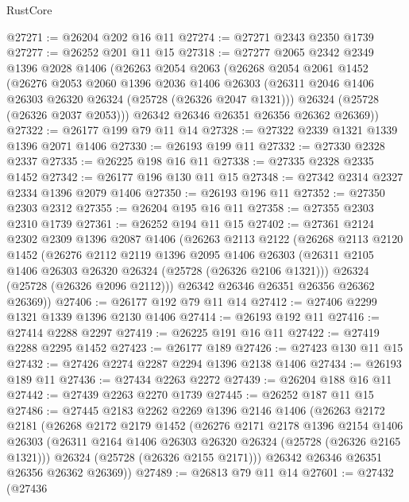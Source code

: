 \begin{lexlean}{RustCore}
\begin{coremodule}
@27271 := @26204 @202 @16 @11
@27274 := @27271 @2343 @2350 @1739
@27277 := @26252 @201 @11 @15
@27318 := @27277
    @2065
    @2342
    @2349
    @1396
    @2028
    @1406
    (@26263
      @2054
      @2063
      (@26268
        @2054
        @2061
        @1452
        (@26276
          @2053
          @2060
          @1396
          @2036
          @1406
          @26303
          (@26311 @2046 @1406 @26303 @26320 @26324 (@25728 (@26326 @2047 @1321)))
          @26324
          (@25728 (@26326 @2037 @2053)))
        @26342
        @26346
        @26351
        @26356
        @26362
        @26369))
@27322 := @26177 @199 @79 @11 @14
@27328 := @27322 @2339 @1321 @1339 @1396 @2071 @1406
@27330 := @26193 @199 @11
@27332 := @27330 @2328 @2337
@27335 := @26225 @198 @16 @11
@27338 := @27335 @2328 @2335 @1452
@27342 := @26177 @196 @130 @11 @15
@27348 := @27342 @2314 @2327 @2334 @1396 @2079 @1406
@27350 := @26193 @196 @11
@27352 := @27350 @2303 @2312
@27355 := @26204 @195 @16 @11
@27358 := @27355 @2303 @2310 @1739
@27361 := @26252 @194 @11 @15
@27402 := @27361
    @2124
    @2302
    @2309
    @1396
    @2087
    @1406
    (@26263
      @2113
      @2122
      (@26268
        @2113
        @2120
        @1452
        (@26276
          @2112
          @2119
          @1396
          @2095
          @1406
          @26303
          (@26311 @2105 @1406 @26303 @26320 @26324 (@25728 (@26326 @2106 @1321)))
          @26324
          (@25728 (@26326 @2096 @2112)))
        @26342
        @26346
        @26351
        @26356
        @26362
        @26369))
@27406 := @26177 @192 @79 @11 @14
@27412 := @27406 @2299 @1321 @1339 @1396 @2130 @1406
@27414 := @26193 @192 @11
@27416 := @27414 @2288 @2297
@27419 := @26225 @191 @16 @11
@27422 := @27419 @2288 @2295 @1452
@27423 := @26177 @189
@27426 := @27423 @130 @11 @15
@27432 := @27426 @2274 @2287 @2294 @1396 @2138 @1406
@27434 := @26193 @189 @11
@27436 := @27434 @2263 @2272
@27439 := @26204 @188 @16 @11
@27442 := @27439 @2263 @2270 @1739
@27445 := @26252 @187 @11 @15
@27486 := @27445
    @2183
    @2262
    @2269
    @1396
    @2146
    @1406
    (@26263
      @2172
      @2181
      (@26268
        @2172
        @2179
        @1452
        (@26276
          @2171
          @2178
          @1396
          @2154
          @1406
          @26303
          (@26311 @2164 @1406 @26303 @26320 @26324 (@25728 (@26326 @2165 @1321)))
          @26324
          (@25728 (@26326 @2155 @2171)))
        @26342
        @26346
        @26351
        @26356
        @26362
        @26369))
@27489 := @26813 @79 @11 @14
@27601 := @27432
    (@27436

\end{coremodule}
\end{lexlean}
